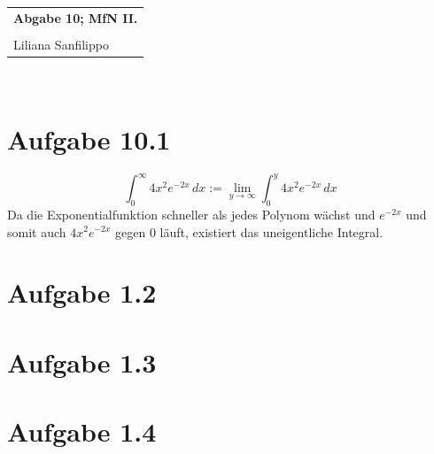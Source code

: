 \documentclass{article} %
\newcommand{\titulo}{Abgabe 10; MfN II.}
\newcommand{\nombre}{Liliana Sanfilippo}
\begin{document}
\begin{tabular}{p{12cm}}
{{\Large\bf\titulo}}\\
\vspace{0.2cm}\\
 {\large\nombre}\\
\end{tabular}
\vspace{0.2cm}\\
\section{Aufgabe 10.1}
\[
\int_0^{\infty} 4x^2 e^{-2x}\,dx := \lim_{y \rightarrow \infty} \int_0^{y} 4x^2 e^{-2x}\,dx
\]
Da die Exponentialfunktion schneller als jedes Polynom wächst und $ e^{-2x}$ und somit auch $4x^2 e^{-2x}$ gegen 0 läuft, existiert das uneigentliche Integral. 



\section{Aufgabe 1.2}

\section{Aufgabe 1.3}

\section{Aufgabe 1.4}
\end{document}

